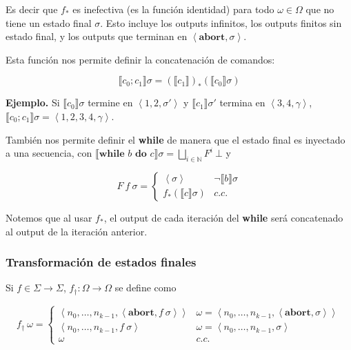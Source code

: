 \documentclass[article, 12pt]{article}
\begin{document}
Es decir que $f_*$ es inefectiva (es la función identidad) para todo $\omega \in
\Omega$ que no tiene un estado final $\sigma$. Esto incluye los outputs infinitos, los
outputs finitos sin estado final, y los outputs que terminan en
$\left<\textbf{abort}, \sigma \right>$.

Esta función nos permite definir la concatenación de comandos:

\begin{equation*}
  \llbracket c_0;c_1 \rrbracket \sigma = \left( \llbracket c_1 \rrbracket
  \right)_* \left( \llbracket c_0 \rrbracket \sigma \right) 
\end{equation*}

\textbf{Ejemplo.} Si $\llbracket c_0 \rrbracket \sigma$ termine en $\left<1, 2,
\sigma'\right>$ y $\llbracket c_1 \rrbracket\sigma'$ termina en $\left<3, 4
, \gamma\right>$, $\llbracket c_0;c_1 \rrbracket\sigma = \left<1, 2, 3, 4
, \gamma\right>$.

También nos permite definir el \textbf{while} de manera que el estado final es
inyectado a una secuencia, con $\llbracket \textbf{while } b \textbf{ do } c
\rrbracket\sigma = \bigsqcup_{i \in \mathbb{N}} F^i ~ \bot $ y

\begin{equation*}
  F ~ f ~ \sigma = \begin{cases}
    \left<\sigma \right> & \neg\llbracket b \rrbracket\sigma \\ 
    f_* (\llbracket c \rrbracket \sigma) & c.c.
  \end{cases}
\end{equation*}

Notemos que al usar $f_*$, el output de cada iteración del \textbf{while} será
concatenado al output de la iteración anterior.

\subsubsection{Transformación de estados finales}

Si $f \in \Sigma \to  \Sigma$, $f_\dagger : \Omega\to \Omega$ se define como 

\begin{equation*}
  f_\dagger ~ \omega = \begin{cases}
    \left<n_0, \ldots, n_{k-1}, \left<\textbf{abort}, f ~ \sigma \right> \right>
    & \omega = \left<n_0,\ldots, n_{k-1}, \left<\textbf{abort}, \sigma \right>
    \right> \\ 
    \left<n_0, \ldots, n_{k-1}, f ~ \sigma \right> & \omega = \left< n_0,
    \ldots, n_{k-1}, \sigma\right> \\ 
    \omega & c.c.
  \end{cases}
\end{equation*}
\end{document}
